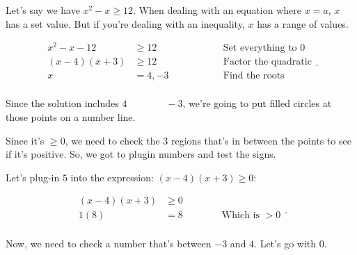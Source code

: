 
Let's say we have $x^{2} -x \ge 12$. When dealing with an equation where $x =
a$, $x$ has a set value. But if you're dealing with an inequality, $x$ has a
range of values.

\begin{equation}
  \label{e qt:solving_quadratic_inequality}
  \begin{alignedat}{2}
    x^{2} - x - 12 &\ge 12 \qquad\qquad &&\textrm{Set everything to $0$} \\
    (x - 4)(x + 3) &\ge 12 \qquad\qquad&& \textrm{Factor the quadratic} \\
    x &= 4, -3 \qquad\qquad&& \textrm{Find the roots} \\
  \end{alignedat}
.\end{equation}

Since the solution includes $4 \qquad\qquad -3$, we're going to put filled
circles at those points on a number line.


Since it's $\ge 0$, we need to check the $3$ regions that's in between the
points to see if it's positive. So, we got to plugin numbers and test the signs.

Let's plug-in $5$ into the expression: $(x - 4)(x + 3) \ge 0$:

\begin{equation}
  \label{eqt:check_signs}
  \begin{split}
    (x - 4)(x + 3) &\ge 0 \\
    1(8) &= 8 \qquad\qquad \textrm{Which is $> 0$} \\
  \end{split}
.\end{equation}

Now, we need to check a number that's between $-3$ and $4$. Let's go with $0$.

